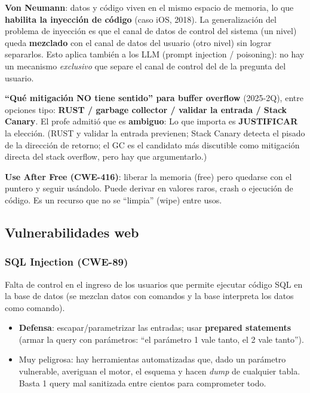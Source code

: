 \documentclass[../main.tex]{subfiles}
\begin{document}
\begin{destacado}
\textbf{Von Neumann}: datos y código viven en el mismo espacio de memoria, lo que \textbf{habilita la inyección de código} (caso iOS, 2018). La generalización del problema de inyección es que el canal de datos de control del sistema (un nivel) queda \textbf{mezclado} con el canal de datos del usuario (otro nivel) sin lograr separarlos. Esto aplica también a los LLM (prompt injection / poisoning): no hay un mecanismo \emph{exclusivo} que separe el canal de control del de la pregunta del usuario.
\end{destacado}

\begin{examen}
\textbf{``Qué mitigación NO tiene sentido'' para buffer overflow} (2025-2Q), entre opciones tipo: \textbf{RUST / garbage collector / validar la entrada / Stack Canary}. El profe admitió que es \textbf{ambiguo}:  Lo que importa es \textbf{JUSTIFICAR} la elección. (RUST y validar la entrada previenen; Stack Canary detecta el pisado de la dirección de retorno; el GC es el candidato más discutible como mitigación directa del stack overflow, pero hay que argumentarlo.)
\end{examen}

\begin{ojo}
\textbf{Use After Free (CWE-416)}: liberar la memoria (free) pero quedarse con el puntero y seguir usándolo. Puede derivar en valores raros, crash o ejecución de código. Es un recurso que no se ``limpia'' (wipe) entre usos.
\end{ojo}

\subsection{Vulnerabilidades web}

\subsubsection{SQL Injection (CWE-89)}
Falta de control en el ingreso de los usuarios que permite ejecutar código SQL en la base de datos (se mezclan datos con comandos y la base interpreta los datos como comando).
\begin{itemize}
  \item \textbf{Defensa}: escapar/parametrizar las entradas; usar \textbf{prepared statements} (armar la query con parámetros: ``el parámetro 1 vale tanto, el 2 vale tanto'').
  \item Muy peligrosa: hay herramientas automatizadas que, dado un parámetro vulnerable, averiguan el motor, el esquema y hacen \emph{dump} de cualquier tabla. Basta 1 query mal sanitizada entre cientos para comprometer todo.
\end{itemize}
\end{document}
